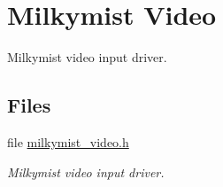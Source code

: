 \hypertarget{group__lm32__milkymist__video}{}\section{Milkymist Video}
\label{group__lm32__milkymist__video}


Milkymist video input driver.  


\subsection*{Files}
\begin{DoxyCompactItemize}
\item 
file \mbox{\hyperlink{milkymist__video_8h}{milkymist\+\_\+video.\+h}}
\begin{DoxyCompactList}\small\item\em Milkymist video input driver. \end{DoxyCompactList}\end{DoxyCompactItemize}
